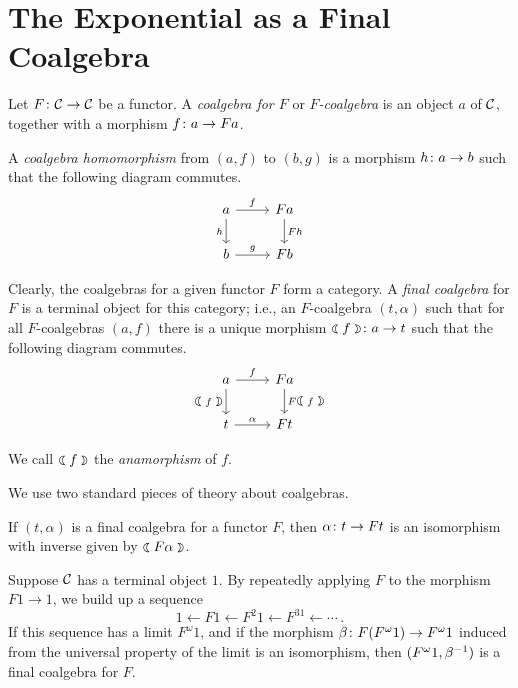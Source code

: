\section{The Exponential as a Final Coalgebra}

\begin{definition}
  Let $F \colon {\mathcal{C}} \to {\mathcal{C}}$ be a functor.  
  A \emph{coalgebra for $F$} or \emph{$F$-coalgebra} is an object $a$ of ${\mathcal{C}}$, together with a morphism $f\colon a \to Fa$.

  A \emph{coalgebra homomorphism} from $(a,f)$ to $(b,g)$ is a morphism $h\colon a \to b$ such that the following diagram commutes.
  \[
    \begin{tikzcd}
      a \arrow[r, "f"] \arrow[d, "h"']
        & Fa \arrow[d, "Fh"] \\
      b \arrow[r, "g"]
        & Fb
    \end{tikzcd}
    \]

  Clearly, the coalgebras for a given functor $F$ form a category.  
  A \emph{final coalgebra} for $F$ is a terminal object for this category; i.e., an $F$-coalgebra $(t,\alpha)$ such that for all $F$-coalgebras $(a,f)$ there is a unique morphism $\fcoal f \from a \to t$ such that the following diagram commutes.
  \[
    \begin{tikzcd}
      a \arrow[r, "f"] \arrow[d, "\fcoal f"']
        & Fa \arrow[d, "F\fcoal f"] \\
      t \arrow[r, "\alpha"]
        & Ft
    \end{tikzcd}
    \]
\end{definition}
We call $\fcoal f$ the \emph{anamorphism} of $f$.

We use two standard pieces of theory about coalgebras.  

\begin{theorem}
  If $(t,\alpha)$ is a final coalgebra for a functor $F$, then $\alpha\colon t \to Ft$ is an isomorphism with inverse given by $\fcoal{F\alpha}$.
\end{theorem}

\begin{theorem}
  Suppose ${\mathcal{C}}$ has a terminal object $1$.  
  By repeatedly applying $F$ to the morphism $F1 \to 1$, we build up a sequence
  \[
    1 \leftarrow F1 \leftarrow F^2 1 \leftarrow F^31 \leftarrow \cdots\,.
    \]
  If this sequence has a limit $F^{\omega}1$, and if the morphism $\beta\colon F(F^{\omega}1) \to F^{\omega}1$ induced from the universal property of the limit is an isomorphism, then $(F^{\omega}1,\beta^{-1})$ is a final coalgebra for $F$.
\end{theorem}

